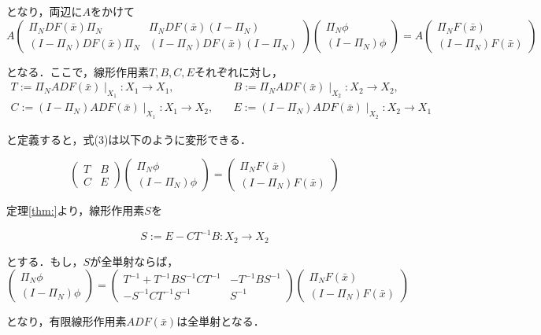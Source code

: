 \documentclass[11pt,a4paper]{jsarticle}
\theoremstyle{definition}
\begin{document}
となり，両辺に$A$をかけて
\begin{equation}
  A
  \begin{pmatrix}
    \Pi_N DF(\bar{x}) \Pi_N & \Pi_N DF(\bar{x}) (I-\Pi_N) \\
    (I-\Pi_N) DF(\bar{x}) \Pi_N & (I-\Pi_N) DF(\bar{x}) (I-\Pi_N)
  \end{pmatrix}
  \begin{pmatrix}
    \Pi_N \phi \\
    (I-\Pi_N) \phi
  \end{pmatrix}
  =A
  \begin{pmatrix}
    \Pi_N F(\bar{x}) \\
    (I - \Pi_N) F(\bar{x})
  \end{pmatrix}
\end{equation}

となる．ここで，線形作用素$T,B,C,E$それぞれに対し，
\begin{equation}
  \begin{split}
    T:= \Pi_N ADF(\bar{x}) \mid _{X_1}:X_1 \rightarrow X_1,\quad & B:= \Pi_N ADF(\bar{x}) \mid _{X_2}:X_2 \rightarrow X_2, \\
    C:= (I-\Pi_N) ADF(\bar{x}) \mid _{X_1}:X_1 \rightarrow X_2,\quad & E:= (I-\Pi_N) ADF(\bar{x}) \mid _{X_2}:X_2 \rightarrow X_1
  \end{split}
\end{equation}

と定義すると，式(3)は以下のように変形できる．

\begin{equation}
  \begin{pmatrix}
    T & B \\
    C & E
  \end{pmatrix}
  \begin{pmatrix}
    \Pi_N \phi \\
    (I -\Pi_N) \phi
  \end{pmatrix}
  =
  \begin{pmatrix}
    \Pi_N F(\bar{x}) \\
    (I - \Pi_N) F(\bar{x})
  \end{pmatrix}
\end{equation}

定理\ref{thm:}より，線形作用素$S$を

\begin{equation}
  S := E-CT^{-1}B:X_2\rightarrow X_2
\end{equation}

とする．もし，$S$が全単射ならば，
\begin{equation*}
  \begin{pmatrix}
    \Pi_N \phi \\
    (I -\Pi_N) \phi
  \end{pmatrix}
  =
  \begin{pmatrix}
    T^{-1}+T^{-1}BS^{-1}CT^{-1} & -T^{-1}BS^{-1} \\
    -S^{-1}CT^{-1} S^{-1} & S^{-1}
  \end{pmatrix}
  \begin{pmatrix}
    \Pi_N F(\bar{x}) \\
    (I - \Pi_N) F(\bar{x})
  \end{pmatrix}
\end{equation*}

となり，有限線形作用素$ADF(\bar{x})$は全単射となる．
\end{document}
